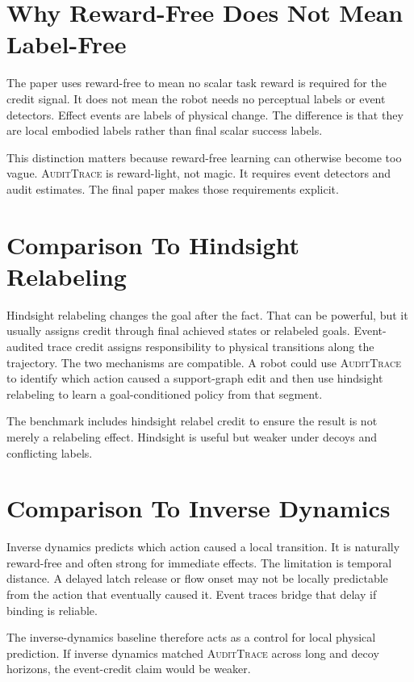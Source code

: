 \documentclass{article}
\newcommand{\method}{\textsc{AuditTrace}\xspace}
\begin{document}
\section{Why Reward-Free Does Not Mean Label-Free}

The paper uses reward-free to mean no scalar task reward is required for the credit signal. It does not mean the robot needs no perceptual labels or event detectors. Effect events are labels of physical change. The difference is that they are local embodied labels rather than final scalar success labels.

This distinction matters because reward-free learning can otherwise become too vague. \method is reward-light, not magic. It requires event detectors and audit estimates. The final paper makes those requirements explicit.

\section{Comparison To Hindsight Relabeling}

Hindsight relabeling changes the goal after the fact. That can be powerful, but it usually assigns credit through final achieved states or relabeled goals. Event-audited trace credit assigns responsibility to physical transitions along the trajectory. The two mechanisms are compatible. A robot could use \method to identify which action caused a support-graph edit and then use hindsight relabeling to learn a goal-conditioned policy from that segment.

The benchmark includes hindsight relabel credit to ensure the result is not merely a relabeling effect. Hindsight is useful but weaker under decoys and conflicting labels.

\section{Comparison To Inverse Dynamics}

Inverse dynamics predicts which action caused a local transition. It is naturally reward-free and often strong for immediate effects. The limitation is temporal distance. A delayed latch release or flow onset may not be locally predictable from the action that eventually caused it. Event traces bridge that delay if binding is reliable.

The inverse-dynamics baseline therefore acts as a control for local physical prediction. If inverse dynamics matched \method across long and decoy horizons, the event-credit claim would be weaker.
\end{document}
